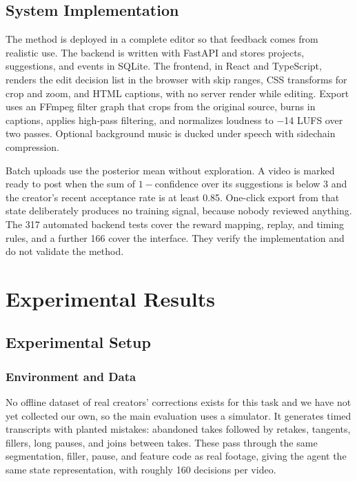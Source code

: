 \documentclass{ieeeaccess}
\begin{document}
\subsection{System Implementation}
The method is deployed in a complete editor so that feedback comes from realistic use. The backend is written with FastAPI and stores projects, suggestions, and events in SQLite. The frontend, in React and TypeScript, renders the edit decision list in the browser with skip ranges, CSS transforms for crop and zoom, and HTML captions, with no server render while editing. Export uses an FFmpeg filter graph that crops from the original source, burns in captions, applies high-pass filtering, and normalizes loudness to $-$14 LUFS over two passes. Optional background music is ducked under speech with sidechain compression.


Batch uploads use the posterior mean without exploration. A video is marked ready to post when the sum of $1-$confidence over its suggestions is below 3 and the creator's recent acceptance rate is at least 0.85. One-click export from that state deliberately produces no training signal, because nobody reviewed anything. The 317 automated backend tests cover the reward mapping, replay, and timing rules, and a further 166 cover the interface. They verify the implementation and do not validate the method.

\section{Experimental Results}
\label{sec:results}

\subsection{Experimental Setup}

\subsubsection{Environment and Data}
No offline dataset of real creators' corrections exists for this task and we have not yet collected our own, so the main evaluation uses a simulator. It generates timed transcripts with planted mistakes: abandoned takes followed by retakes, tangents, fillers, long pauses, and joins between takes. These pass through the same segmentation, filler, pause, and feature code as real footage, giving the agent the same state representation, with roughly 160 decisions per video.
\end{document}
